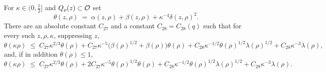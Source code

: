 \documentclass[11pt,reqno]{amsart}
\begin{document}
\begin{lemma}\label{lem:theta-decay}
For $\kappa\in(0,\tfrac12]$ and $Q_{\rho}(z)\subset\mathcal{O}$ set
\begin{equation}\label{eq:theta}
  \theta(z,\rho)\;=\;\alpha(z,\rho)+\beta(z,\rho)+\kappa^{-4}\delta(z,\rho)^{2}.
\end{equation}
There are an absolute constant $C_{27}$ and a constant $C_{28}=C_{28}(q)$ such
that for every such $z,\rho,\kappa$, suppressing $z$,
\begin{equation}\label{eq:theta-decay-1}
  \theta(\kappa\rho)\;\le\;C_{27}\kappa^{2/3}\theta(\rho)
   +C_{27}\kappa^{-5}\bigl(\beta(\rho)^{1/2}+\beta(\rho)\bigr)\theta(\rho)
   +C_{28}\kappa^{-1/2}\theta(\rho)^{1/2}\lambda(\rho)^{1/2}
   +C_{28}\kappa^{-3}\lambda(\rho),
\end{equation}
and, if in addition $\theta(\rho)\le1$,
\begin{equation}\label{eq:theta-decay-2}
  \theta(\kappa\rho)\;\le\;C_{27}\kappa^{2/3}\theta(\rho)
   +2C_{27}\kappa^{-5}\theta(\rho)^{1/2}\theta(\rho)
   +C_{28}\kappa^{-1/2}\theta(\rho)^{1/2}\lambda(\rho)^{1/2}
   +C_{28}\kappa^{-3}\lambda(\rho).
\end{equation}
\end{lemma}
\end{document}
